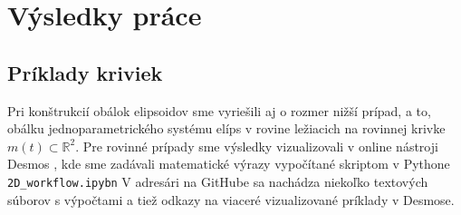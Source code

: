 \chapter{Výsledky práce}

\section{Príklady kriviek}
Pri konštrukcií obálok elipsoidov sme vyriešili aj o rozmer nižší prípad, a to, obálku jednoparametrického systému elíps v rovine ležiacich na rovinnej krivke $m(t) \subset \mathbb{R}^2$. Pre rovinné prípady sme výsledky vizualizovali v online nástroji Desmos \cite{Desmos}, kde sme zadávali matematické výrazy vypočítané skriptom v Pythone \verb|2D_workflow.ipybn| V adresári na GitHube sa nachádza niekoľko textových súborov s výpočtami a tiež odkazy na viaceré vizualizované príklady v Desmose.

